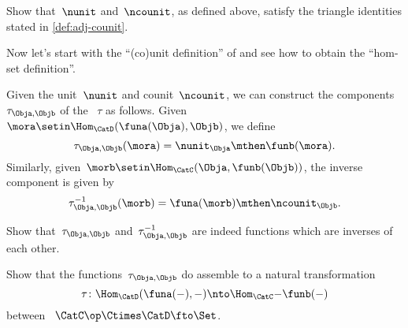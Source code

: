 \begin{solution}
    \missingsolution
\end{solution}

\begin{exercise}
    \label{ex:eta-epsilon-triangle}
    Show that~$\nunit$ and~$\ncounit$, as defined above, satisfy the triangle identities stated in \cref{def:adj-counit}.
\end{exercise}

\begin{solution}
    \missingsolution
\end{solution}

Now let's start with the ``(co)unit definition'' of  and see how to obtain the ``hom-set definition''.

Given the unit~$\nunit$ and counit~$\ncounit$, we can construct the components~$\tau_{\Obja,\Objb}$ of the ~$\tau$ as follows.
Given~$\mora \setin \Hom_{\CatD}(\funa(\Obja),\Objb)$, we define
\begin{equation}
    \tau_{\Obja,\Objb}(\mora) = \nunit_\Obja \mthen \funb(\mora).
\end{equation}
Similarly, given~$\morb \setin \Hom_{\CatC}(\Obja,\funb(\Objb))$, the inverse component is given by
\begin{equation}
    \tau_{\Obja,\Objb}^{-1}(\morb) = \funa(\morb) \mthen \ncounit_\Objb.
\end{equation}

\begin{exercise}
    \label{ex:tau}
    Show that~$\tau_{\Obja,\Objb}$ and~$\tau_{\Obja,\Objb}^{-1}$ are indeed functions which are inverses of each other.
\end{exercise}

\begin{solution}
    \missingsolution
\end{solution}

\begin{exercise}
    \label{ex:tau2}
    Show that the functions~$\tau_{\Obja,\Objb}$ do assemble to a natural transformation
    \begin{equation}
        \tau  \colon \Hom_{\CatD}(\funa(-),- ) \nto \Hom_{\CatC}{-}{\funb(-)}
    \end{equation}
    between ~$\CatC\op \Ctimes \CatD \fto \Set $.
\end{exercise}

\begin{solution}
    \missingsolution
\end{solution}
